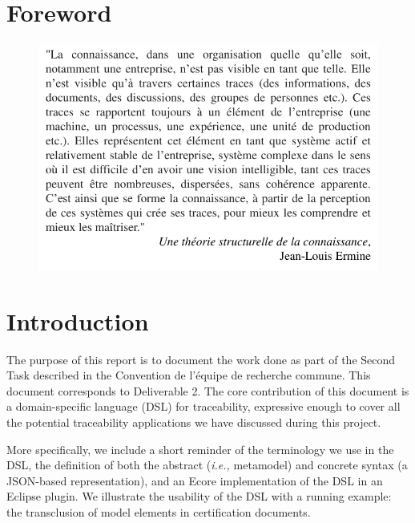 
\section*{Foreword}
\begin{figure}[ht] 
	
	\centering
	\includegraphics[width=.7\linewidth]{images/citation-ermine.pdf}
\end{figure}



\section{Introduction}
\label{sect:intro}


The purpose of this report is to document the work done as part of the Second Task described in the Convention de l’équipe de recherche commune. This document corresponds to Deliverable 2. The core contribution of this document is a domain-specific language (DSL) for traceability, expressive enough to cover all the potential traceability applications we have discussed during this project. 

More specifically, we include a short reminder of the terminology we use in the DSL, the definition of both the abstract (\textit{i.e.,} metamodel) and concrete syntax (a JSON-based representation), and an Ecore implementation of the DSL in an Eclipse plugin. We illustrate the usability of the DSL with a running example: the transclusion of model elements in certification documents.


